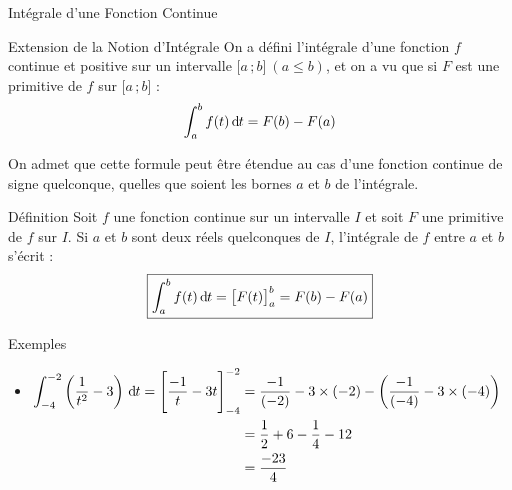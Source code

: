 \documentclass{coursbook}
\begin{document}
    \begin{Gpartie}{Intégrale d'une Fonction Continue} 
        \begin{Spartie}{Extension de la Notion d'Intégrale} 
            On a défini l'intégrale d'une fonction $f$ continue et positive sur un intervalle $\big[a\,; b\big]~\left(a\leq b\right)$, et on a vu que si $F$ est une primitive de $f$ sur $\big[a\,; b\big]$ : \[\int_a^b f(t)\,\mathrm{d}\hspace*{-0.05em}t=F(b)-F(a)\]

            On admet que cette formule peut être étendue au cas d'une fonction continue de signe quelconque, quelles que soient les bornes $a$ et $b$ de l'intégrale.

            \begin{SSpartie}{Définition} 
                Soit $f$ une fonction continue sur un intervalle $I$ et soit $F$ une primitive de $f$ sur $I$. Si $a$ et $b$ sont deux réels quelconques de $I$, l'intégrale de $f$ entre $a$ et $b$ s'écrit : \[\boxed{\int_a^b f(t)\,\mathrm{d}\hspace*{-0.05em}t=\big[F(t)\big]_a^b=F(b)-F(a)}\]
            \end{SSpartie}
            \begin{SSpartie}{Exemples} 
                \begin{itemize}
                    \item   
                    $\begin{aligned}[t]
                        \int_{-4}^{-2}\left(\frac{1}{t^2}-3\right)\dt=\Bigg[\frac{-1}{t}-3t\Bigg]_{-4}^{-2}&=\frac{-1}{(-2)}-3\times(-2)-\left(\frac{-1}{(-4)}-3\times(-4)\right)  \\
                        &=\frac{1}{2}+6-\frac{1}{4}-12 \\
                        &=\frac{-23}{4}
                    \end{aligned}$


\end{itemize}
\end{SSpartie}
\end{Spartie}
\end{Gpartie}
\end{document}
